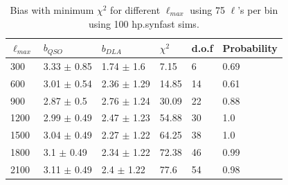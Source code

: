 \documentclass{amsart}
\begin{document}
\begin{table}[htbp]
\vspace{2cm}
\caption{Bias with minimum $\chi^2$  for different $\ell_{max}$ using 75 $\ell$'s per bin using 100 hp.synfast sims.}
\centering
\begin{tabular}{p{}p{}p{}p{}p{}p{}} \\ \toprule
$\ell_{max}$ & \multicolumn{1}{p{0cm}}{$b_{QSO}$} & $b_{DLA}$ & \multicolumn{1}{p{2cm}}{$\chi^2$} & d.o.f  & Probability\\ \midrule
300  &  3.33  $\pm$  0.85  &  1.74  $\pm$  1.6  &  7.15  &  6  &  0.69 \\
600  &  3.01  $\pm$  0.54  &  2.36  $\pm$  1.29  &  14.85  &  14  &  0.61 \\
900  &  2.87  $\pm$  0.5  &  2.76  $\pm$  1.24  &  30.09  &  22  &  0.88 \\
1200  &  2.99  $\pm$  0.49  &  2.47  $\pm$  1.23  &  54.88  &  30  &  1.0 \\
1500  &  3.04  $\pm$  0.49  &  2.27  $\pm$  1.22  &  64.25  &  38  &  1.0 \\
1800  &  3.1  $\pm$  0.49  &  2.34  $\pm$  1.22  &  72.38  &  46  &  0.99 \\
2100  &  3.11  $\pm$  0.49  &  2.4  $\pm$  1.22  &  77.6  &  54  &  0.98 \\ \bottomrule
\end{tabular}
\end{table}
\end{document}
